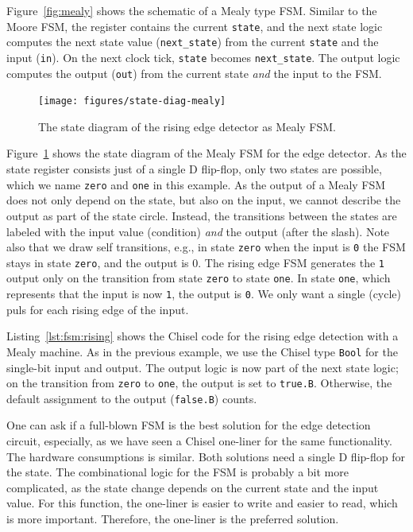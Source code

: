 \documentclass[%
    10pt,
    headinclude, footexclude,
    openright, %
    notitlepage,
    cleardoubleempty,
    headsepline,
    pointlessnumbers,
    bibtotoc, idxtotoc,
    ]{scrbook}
\newcommand{\code}[1]{{\small{\texttt{#1}}}}
\begin{document}
Figure~\ref{fig:mealy} shows the schematic of a Mealy type FSM.
Similar to the Moore FSM, the register contains the current \code{state}, and
the next state logic computes the next state value (\code{next\_state})
from the current \code{state} and the input (\code{in}).
On the next clock tick, \code{state} becomes \code{next\_state}.
The output logic computes the output (\code{out}) from the current state
\emph{and} the input to the FSM.


\begin{figure}
  \centering
  \texttt{[image: figures/state-diag-mealy]}
  \caption{The state diagram of the rising edge detector as Mealy FSM.}
  \label{fig:diag:mealy}
\end{figure}

Figure~\ref{fig:diag:mealy} shows the state diagram of the Mealy FSM for the
edge detector. As the state register consists just of a single D flip-flop,
only two states are possible, which we name \code{zero} and \code{one} in this
example.
As the output of a Mealy FSM does not only depend on the state, but also
on the input, we cannot describe the output as part of the state circle.
Instead, the transitions between the states are labeled with the input
value (condition) \emph{and} the output (after the slash).
Note also that we draw self transitions, e.g., in state \code{zero} when
the input is \code{0} the FSM stays in state \code{zero}, and the output is {0}.
The rising edge FSM generates the \code{1} output only on the transition
from state \code{zero} to state \code{one}. In state \code{one}, which represents
that the input is now \code{1}, the output is \code{0}. We only want a single (cycle)
puls for each rising edge of the input.


Listing~\ref{lst:fsm:rising} shows the Chisel code for the rising edge detection
with a Mealy machine.
As in the previous example, we use the Chisel type \code{Bool} for the
single-bit input and output.
The output logic is now part of the next state logic; on the transition from
\code{zero} to \code{one}, the output is set to \code{true.B}. Otherwise,
the default assignment to the output (\code{false.B}) counts.

One can ask if a full-blown FSM is the best solution for the edge detection circuit,
especially, as we have seen a Chisel one-liner for the same functionality.
The hardware consumptions is similar. Both solutions need a single D flip-flop
for the state. The combinational logic for the FSM is probably a bit more complicated, as
the state change depends on the current state and the input value.
For this function, the one-liner is easier to write and easier to read,
which is more important. Therefore, the one-liner is the preferred solution.
\end{document}

